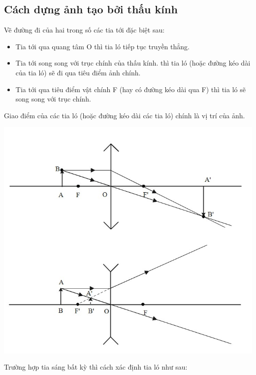 \subsection{Cách dựng ảnh tạo bởi thấu kính}
Vẽ đường đi của hai trong số các tia tới đặc biệt sau:
\begin{itemize}
	\item Tia tới qua quang tâm O thì tia ló tiếp tục truyền thẳng.
	\item Tia tới song song với trục chính của thấu kính. thì tia ló (hoặc đường kéo dài của tia ló) sẽ đi qua tiêu điểm ảnh chính.
	\item Tia tới qua tiêu điểm vật chính F (hay có đường kéo dài qua F) thì tia ló sẽ song song với trục chính.
\end{itemize}
Giao điểm của các tia ló (hoặc đường kéo dài các tia ló) chính là vị trí của ảnh. 
\begin{center}
	\includegraphics[scale=0.7]{../figs/VN11-PH-38-A-004-1-h25.jpg}
\end{center}
Trường hợp tia sáng bất kỳ thì cách xác định tia ló như sau:
